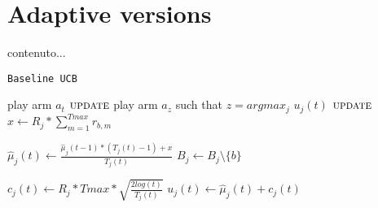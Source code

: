 \section{Adaptive versions}























































\iffalse
	contenuto...




\begin{algorithm}[!h]
	\caption{\texttt{Baseline UCB}}
	\begin{scriptsize}
		\begin{algorithmic}[1]
			
			
			\Statex
			 
				\State play arm $a_t$\;
				\State $\textsc{update}$
			\EndFor
			 
				\State play arm $a_z$ such that  $z = argmax_j$ $u_j (t)$\;
				\State $\textsc{update}$
			\EndFor
			\EndFunction
			\Statex
						\State$x \gets   R_j * \sum_{m=1}^{Tmax}r_{b,m} $\;
						
						\State$\hat{\mu}_j(t) \gets \frac{\hat{\mu}_j(t-1)*(T_j(t)-1)+x}{T_j(t)}$\;
						\State$B_j \gets B_j \setminus \{b\}$\;	
										
					\EndIf				
				\EndFor			
				
			\State$c_j(t)\gets R_j * Tmax * \sqrt{\frac{2log(t)}{T_j(t)}}$\;
			\State$u_j(t) \gets  \hat{\mu}_j(t) +  c_j(t)$
			\EndFor
			
			
			
			
			\EndFunction
			
		\end{algorithmic}
	\end{scriptsize}
	\label{alg:BaselineUCB}
\end{algorithm}


